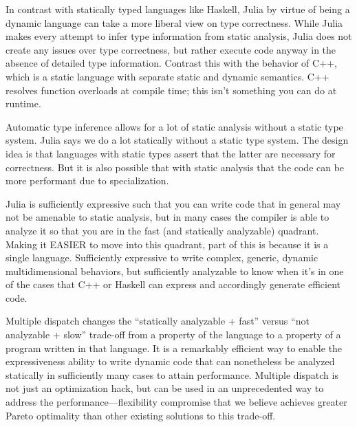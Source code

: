 \documentclass[preprint]{sigplanconf}
\begin{document}
In contrast with statically typed languages like Haskell, Julia by virtue of
being a dynamic language can take a more liberal view on type correctness.
While Julia makes every attempt to infer type information from static
analysis, Julia does not create any issues over type correctness, but rather
execute code anyway in the absence of detailed type information. Contrast this
with the behavior of C++, which is a static language with separate static and
dynamic semantics. C++ resolves function overloads at compile time; this isn't
something you can do at runtime.

Automatic type inference allows for a lot of static analysis without a static
type system. Julia says we do a lot statically without a static type system.
The design idea is that languages with static types assert that the latter are
necessary for correctness. But it is also possible that with static analysis
that the code can be more performant due to specialization.

Julia is sufficiently expressive such that you can write code that in general
may not be amenable to static analysis, but in many cases the compiler is able
to analyze it so that you are in the fast (and statically analyzable)
quadrant. Making it EASIER to move into this quadrant, part of this is because
it is a single language. Sufficiently expressive to write complex, generic,
dynamic multidimensional behaviors, but sufficiently analyzable to know when
it's in one of the cases that C++ or Haskell can express and accordingly
generate efficient code.

Multiple dispatch changes the ``statically analyzable + fast'' versus ``not
analyzable + slow'' trade-off from a property of the language to a property of
a program written in that language. It is a remarkably efficient way to enable
the expressiveness ability to write dynamic code that can nonetheless be
analyzed statically in sufficiently many cases to attain performance. Multiple
dispatch is not just an optimization hack, but can be used in an unprecedented
way to address the performance---flexibility compromise that we believe
achieves greater Pareto optimality than other existing solutions to this
trade-off.

%

\acks
\end{document}

